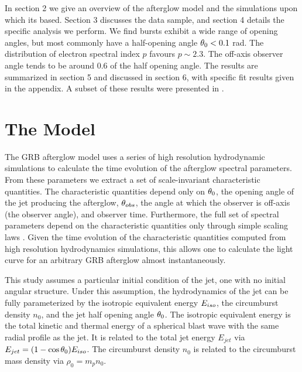 In section 2 we give an overview of the \scalefit{} afterglow model and the simulations upon which its based.  Section 3 discusses the \swiftXRT{} data sample, and section 4 details the specific analysis we perform.  We find bursts exhibit a wide range of opening angles, but most commonly have a half-opening angle $\theta_0 < 0.1$ rad.  The distribution of electron spectral index $p$ favours $p\sim2.3$.  The off-axis observer angle tends to be around 0.6 of the half opening angle.  The results are summarized in section 5 and discussed in section 6, with specific fit results given in the appendix.  A subset of these results were presented in \cite{Ryan13}.


\section{The Model}

The \scalefit{} GRB afterglow model uses a series of high resolution hydrodynamic simulations to calculate the time evolution of the afterglow spectral parameters.  From these parameters we extract a set of scale-invariant characteristic quantities.  The characteristic quantities depend only on $\theta_0$, the opening angle of the jet producing the afterglow, $\theta_{obs}$, the angle at which the observer is off-axis (the observer angle), and observer time.  Furthermore, the full set of spectral parameters depend on the characteristic quantities only through simple scaling laws \citep{vanEer12scale}.  Given the time evolution of the characteristic quantities computed from high resolution hydrodynamics simulations, this allows one to calculate the light curve for an arbitrary GRB afterglow almost instantaneously.

This study assumes a particular initial condition of the jet, one with no initial angular structure.  Under this assumption, the hydrodynamics of the jet can be fully parameterized by the isotropic equivalent energy $E_{iso}$, the circumburst density $n_0$, and the jet half opening angle $\theta_0$.  The isotropic equivalent energy is the total kinetic and thermal energy of a spherical blast wave with the same radial profile as the jet.  It is related to the total jet energy $E_{jet}$ via $E_{jet} = (1-\cos \theta_0)E_{iso}$.  The circumburst density $n_0$ is related to the circumburst mass density via $\rho_0 = m_p n_0$.

